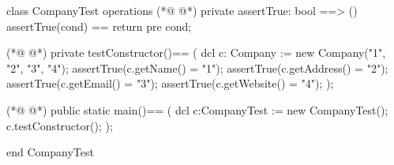\begin{vdmpp}[breaklines=true]
class CompanyTest
 operations
(*@
\label{assertTrue:3}
@*)
  private assertTrue: bool ==> ()
    assertTrue(cond) == return
    pre cond;
    
(*@
\label{testConstructor:7}
@*)
  private testConstructor()==
  (
   dcl c: Company := new Company("1", "2", "3", "4");
   assertTrue(c.getName() = "1");
   assertTrue(c.getAddress() = "2");
   assertTrue(c.getEmail() = "3");
   assertTrue(c.getWebsite() = "4");
  );
 
(*@
\label{main:16}
@*)
  public static main()==
    (
   dcl c:CompanyTest := new CompanyTest();
   c.testConstructor();
    );

end CompanyTest
\end{vdmpp}
